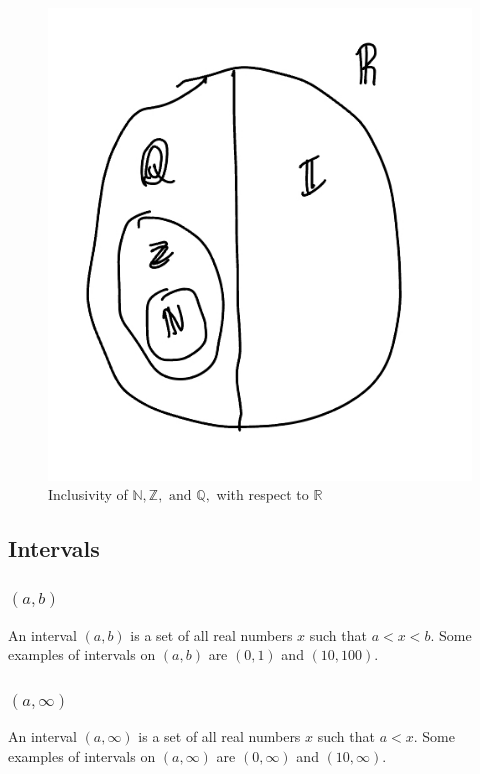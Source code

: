 \documentclass{article}
\begin{document}
\begin{figure}[!htb]
    \centering
    \includegraphics[scale=0.2]{inclusivity.jpeg}
    \caption{Inclusivity of $\mathbb{N}, \mathbb{Z}, \text{ and }\mathbb{Q},$ with respect to $\mathbb{R}$}
\end{figure}

\newpage
\subsection{Intervals}

\subsubsection{$(a, b)$}

An interval $(a, b)$ is a set of all real numbers $x$ such that $a < x < b$. Some examples of intervals on $(a, b)$ are $(0, 1)$ and $(10, 100)$.

\subsubsection{$(a, \infty)$}

An interval $(a, \infty)$ is a set of all real numbers $x$ such that $a < x$. Some examples of intervals on $(a, \infty)$ are $(0, \infty)$ and $(10, \infty)$.
\end{document}
